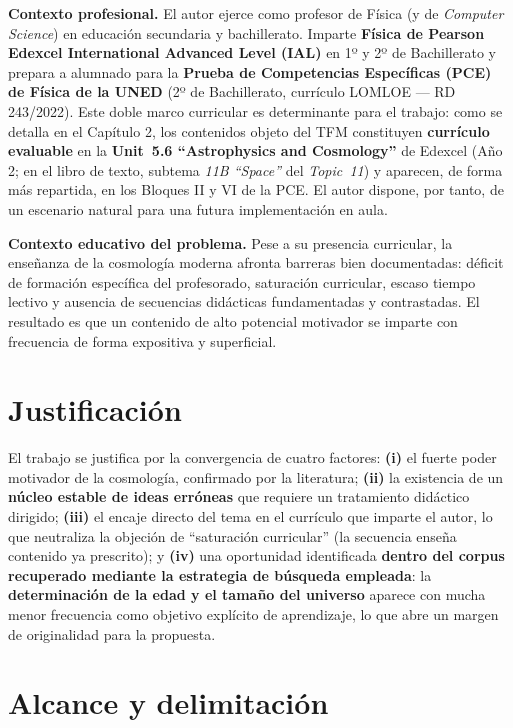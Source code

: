 \textbf{Contexto profesional.} El autor ejerce como profesor de Física (y de \textit{Computer Science}) en educación secundaria y bachillerato. Imparte \textbf{Física de Pearson Edexcel International Advanced Level (IAL)} en 1º y 2º de Bachillerato y prepara a alumnado para la \textbf{Prueba de Competencias Específicas (PCE) de Física de la UNED} (2º de Bachillerato, currículo LOMLOE --- RD 243/2022). Este doble marco curricular es determinante para el trabajo: como se detalla en el Capítulo 2, los contenidos objeto del TFM constituyen \textbf{currículo evaluable} en la \textbf{Unit~5.6 ``Astrophysics and Cosmology''} de Edexcel (Año 2; en el libro de texto, subtema \textit{11B ``Space''} del \textit{Topic~11}) y aparecen, de forma más repartida, en los Bloques II y VI de la PCE. El autor dispone, por tanto, de un escenario natural para una futura implementación en aula.

\textbf{Contexto educativo del problema.} Pese a su presencia curricular, la enseñanza de la cosmología moderna afronta barreras bien documentadas: déficit de formación específica del profesorado, saturación curricular, escaso tiempo lectivo y ausencia de secuencias didácticas fundamentadas y contrastadas. El resultado es que un contenido de alto potencial motivador se imparte con frecuencia de forma expositiva y superficial.

\section{Justificación}\label{sec:justificacion}

El trabajo se justifica por la convergencia de cuatro factores: \textbf{(i)} el fuerte poder motivador de la cosmología, confirmado por la literatura; \textbf{(ii)} la existencia de un \textbf{núcleo estable de ideas erróneas} que requiere un tratamiento didáctico dirigido; \textbf{(iii)} el encaje directo del tema en el currículo que imparte el autor, lo que neutraliza la objeción de ``saturación curricular'' (la secuencia enseña contenido ya prescrito); y \textbf{(iv)} una oportunidad identificada \textbf{dentro del corpus recuperado mediante la estrategia de búsqueda empleada}: la \textbf{determinación de la edad y el tamaño del universo} aparece con mucha menor frecuencia como objetivo explícito de aprendizaje, lo que abre un margen de originalidad para la propuesta.

\section{Alcance y delimitación}\label{sec:alcance}

